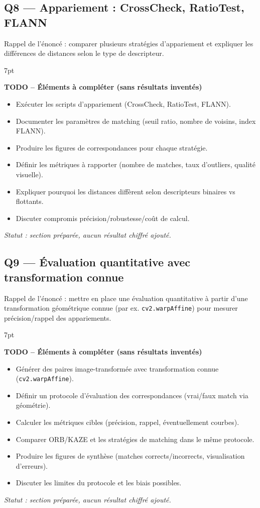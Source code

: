\documentclass[11pt,a4paper]{article}
\newenvironment{formal}{%
\def\FrameCommand{%
  \hspace{1pt}%
  {\color{enstaBleuFonce}\vrule width 2pt}%
  {\color{formalshade}\vrule width 4pt}%
  \colorbox{formalshade}%
}%
\MakeFramed{\advance\hsize-\width\FrameRestore}%
\noindent\hspace{-4.55pt}%
\begin{adjustwidth}{}{7pt}%
\vspace{4pt}%
}{%
\vspace{4pt}\end{adjustwidth}\endMakeFramed%
}
\begin{document}
\subsection{Q8 --- Appariement : CrossCheck, RatioTest, FLANN}
Rappel de l'énoncé : comparer plusieurs stratégies d'appariement et expliquer les différences de distances selon le type de descripteur.

\begin{formal}
\textbf{TODO -- Éléments à compléter (sans résultats inventés)}
\begin{itemize}[leftmargin=1.5em]
  \item Exécuter les scripts d'appariement (CrossCheck, RatioTest, FLANN).
  \item Documenter les paramètres de matching (seuil ratio, nombre de voisins, index FLANN).
  \item Produire les figures de correspondances pour chaque stratégie.
  \item Définir les métriques à rapporter (nombre de matches, taux d'outliers, qualité visuelle).
  \item Expliquer pourquoi les distances diffèrent selon descripteurs binaires vs flottants.
  \item Discuter compromis précision/robustesse/coût de calcul.
\end{itemize}
\end{formal}
\textit{Statut : section préparée, aucun résultat chiffré ajouté.}

\subsection{Q9 --- Évaluation quantitative avec transformation connue}
Rappel de l'énoncé : mettre en place une évaluation quantitative à partir d'une transformation géométrique connue (par ex. \texttt{cv2.warpAffine}) pour mesurer précision/rappel des appariements.

\begin{formal}
\textbf{TODO -- Éléments à compléter (sans résultats inventés)}
\begin{itemize}[leftmargin=1.5em]
  \item Générer des paires image-transformée avec transformation connue (\texttt{cv2.warpAffine}).
  \item Définir un protocole d'évaluation des correspondances (vrai/faux match via géométrie).
  \item Calculer les métriques cibles (précision, rappel, éventuellement courbes).
  \item Comparer ORB/KAZE et les stratégies de matching dans le même protocole.
  \item Produire les figures de synthèse (matches corrects/incorrects, visualisation d'erreurs).
  \item Discuter les limites du protocole et les biais possibles.
\end{itemize}
\end{formal}
\textit{Statut : section préparée, aucun résultat chiffré ajouté.}
\end{document}

